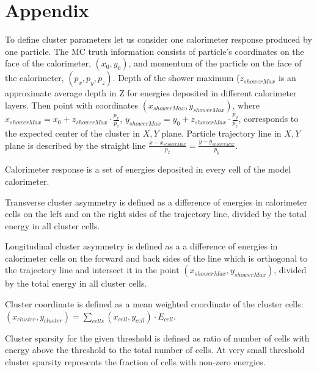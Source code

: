 \section{Appendix}
To define cluster parameters let us consider one calorimeter response produced by one particle. The MC truth information consists of particle's coordinates on the face of the calorimeter, $(x_0, y_0)$, and momentum of the particle on the face of the calorimeter,
 $(p_x, p_y, p_z)$. Depth of the shower maximum ($z_{showerMax}$ is an approximate average depth in Z for energies deposited in different calorimeter layers. 
Then point with coordinates $(x_{showerMax}, y_{showerMax})$, 
where $x_{showerMax} = x_0 + z_{showerMax} \cdot \frac{p_x}{p_z}$, $y_{showerMax} = y_0 + z_{showerMax} \cdot \frac{p_y}{ p_z}$, 
corresponds to the expected center of the cluster in $X, Y$ plane. Particle trajectory line in   $X, Y$ plane is described by the straight line
$\frac{x-x_{showerMax}}{p_x}  = \frac{y-y_{showerMax}}{p_y}$.

Calorimeter response is a set of energies deposited in every cell of the model calorimeter. 

Transverse cluster asymmetry is defined as a difference of energies in calorimeter cells on the left and on the right sides of the trajectory line, divided
by the total energy in all cluster cells.

Longitudinal cluster asymmetry is  defined as a a difference of energies in calorimeter cells on the forward and back sides of the line which
is orthogonal to the trajectory line and intersect it in the point $(x_{showerMax}, y_{showerMax})$, 
divided by the total energy in all cluster cells.

Cluster coordinate is defined as a mean weighted coordinate of the cluster cells: 
$(x_{cluster}, y_{cluster}) = \sum_{cells} (x_{cell}, y_{cell}) \cdot E_{cell}$.

Cluster sparsity for the given threshold is defined as ratio of number of cells with energy above the threshold
to the total number of cells. At very small threshold cluster sparsity represents the fraction of cells with
non-zero energies. 
